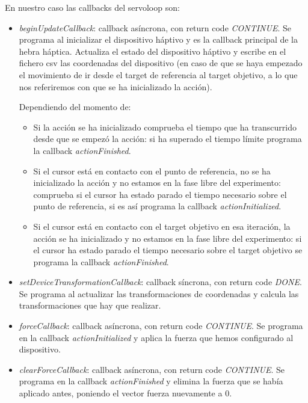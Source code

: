 \documentclass[a4paper,11pt, oneside]{book}
\begin{document}
En nuestro caso las callbacks del servoloop son:
\begin{itemize}
	\item \textit{beginUpdateCallback}: callback asíncrona, con return code \textit{CONTINUE}. Se programa al inicializar el dispositivo háptivo y es la callback principal de la hebra háptica.  Actualiza el estado del dispositivo háptivo y escribe en el fichero csv las coordenadas del dispositivo (en caso de que se haya empezado el movimiento de ir desde el target de referencia al target objetivo, a lo que nos referiremos con que se ha inicializado la acción). 
	
	Dependiendo del momento de:
	\begin{itemize}
		\item Si la acción se ha inicializado comprueba el tiempo que ha transcurrido desde que se empezó la acción: si ha superado el tiempo límite programa la callback \textit{actionFinished}.
		\item Si el cursor está en contacto con el punto de referencia, no se ha inicializado la acción y no estamos en la fase libre del experimento: comprueba si el cursor ha estado parado el tiempo necesario sobre el punto de referencia, si es así programa la callback \textit{actionInitialized}.
		\item Si el cursor está en contacto con el target objetivo en esa iteración, la acción se ha inicializado y no estamos en la fase libre del experimento: si el cursor ha estado parado el tiempo necesario sobre el target objetivo se programa la callback \textit{actionFinished}.
	\end{itemize}
	
	\item \textit{setDeviceTransformationCallback}: callback síncrona, con return code \textit{DONE}. Se programa al actualizar las transformaciones de coordenadas y calcula las transformaciones que hay que realizar.
	
	\item \textit{forceCallback}: callback asíncrona, con return code \textit{CONTINUE}. Se programa en la callback \textit{actionInitialized} y aplica la fuerza que hemos configurado al dispositivo. 
	
	\item \textit{clearForceCallback}: callback asíncrona, con return code \textit{CONTINUE}. Se programa en la callback \textit{actionFinished} y elimina la fuerza que se había aplicado antes, poniendo el vector fuerza nuevamente a 0. 
	

\end{itemize}
\end{document}

